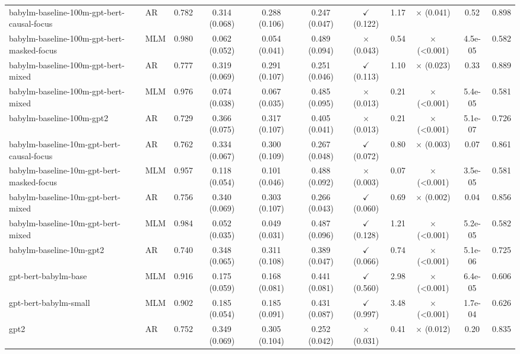 \begin{table}[]
\begin{adjustbox}{max width=\textwidth}
\begin{tabular}{llccccccccc}
babylm-baseline-100m-gpt-bert-causal-focus & AR & 0.782 & 0.314 (0.068) & 0.288 (0.106) & 0.247 (0.047) & $\checkmark$ (0.122) & 1.17 & $\times$ (0.041) & 0.52 & 0.898 \\
babylm-baseline-100m-gpt-bert-masked-focus & MLM & 0.980 & 0.062 (0.052) & 0.054 (0.041) & 0.489 (0.094) & $\times$ (0.043) & 0.54 & $\times$ (<0.001) & 4.5e-05 & 0.582 \\
babylm-baseline-100m-gpt-bert-mixed & AR & 0.777 & 0.319 (0.069) & 0.291 (0.107) & 0.251 (0.046) & $\checkmark$ (0.113) & 1.10 & $\times$ (0.023) & 0.33 & 0.889 \\
babylm-baseline-100m-gpt-bert-mixed & MLM & 0.976 & 0.074 (0.038) & 0.067 (0.035) & 0.485 (0.095) & $\times$ (0.013) & 0.21 & $\times$ (<0.001) & 5.4e-05 & 0.581 \\
babylm-baseline-100m-gpt2 & AR & 0.729 & 0.366 (0.075) & 0.317 (0.107) & 0.405 (0.041) & $\times$ (0.013) & 0.21 & $\times$ (<0.001) & 5.1e-07 & 0.726 \\
babylm-baseline-10m-gpt-bert-causal-focus & AR & 0.762 & 0.334 (0.067) & 0.300 (0.109) & 0.267 (0.048) & $\checkmark$ (0.072) & 0.80 & $\times$ (0.003) & 0.07 & 0.861 \\
babylm-baseline-10m-gpt-bert-masked-focus & MLM & 0.957 & 0.118 (0.054) & 0.101 (0.046) & 0.488 (0.092) & $\times$ (0.003) & 0.07 & $\times$ (<0.001) & 3.5e-05 & 0.581 \\
babylm-baseline-10m-gpt-bert-mixed & AR & 0.756 & 0.340 (0.069) & 0.303 (0.107) & 0.266 (0.043) & $\checkmark$ (0.060) & 0.69 & $\times$ (0.002) & 0.04 & 0.856 \\
babylm-baseline-10m-gpt-bert-mixed & MLM & 0.984 & 0.052 (0.035) & 0.049 (0.031) & 0.487 (0.096) & $\checkmark$ (0.128) & 1.21 & $\times$ (<0.001) & 5.2e-05 & 0.582 \\
babylm-baseline-10m-gpt2 & AR & 0.740 & 0.348 (0.065) & 0.311 (0.108) & 0.389 (0.047) & $\checkmark$ (0.066) & 0.74 & $\times$ (<0.001) & 5.1e-06 & 0.725 \\
gpt-bert-babylm-base & MLM & 0.916 & 0.175 (0.059) & 0.168 (0.081) & 0.441 (0.081) & $\checkmark$ (0.560) & 2.98 & $\times$ (<0.001) & 6.4e-05 & 0.606 \\
gpt-bert-babylm-small & MLM & 0.902 & 0.185 (0.054) & 0.185 (0.091) & 0.431 (0.087) & $\checkmark$ (0.997) & 3.48 & $\times$ (<0.001) & 1.7e-04 & 0.626 \\
gpt2 & AR & 0.752 & 0.349 (0.069) & 0.305 (0.104) & 0.252 (0.042) & $\times$ (0.031) & 0.41 & $\times$ (0.012) & 0.20 & 0.835 \\

\end{tabular}
\end{adjustbox}
\end{table}
